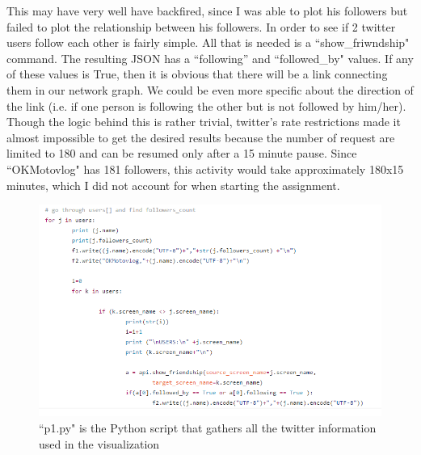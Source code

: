 \documentclass{article}
\begin{document}
This may have very well have backfired, since I was able to plot his followers but failed to plot the relationship between his followers. In order to see if 2 twitter users follow each other is fairly simple. All that is needed is a ``show\_friwndship" command. The resulting JSON has a ``following'' and ``followed\_by" values. If any of these values is True, then it is obvious that there will be a link connecting them in our network graph. We could be even more specific about the direction of the link (i.e. if one person is following the other but is not followed by him/her). Though the logic behind this is rather trivial, twitter's rate restrictions made it almost impossible to get the desired results because the number of request are limited to 180 and can be resumed only after a 15 minute pause. Since ``OKMotovlog" has 181 followers, this activity would take approximately 180x15 minutes, which I did not account for when starting the assignment.

\begin{figure}[H]
 \centering
 	\includegraphics[height=12 cm]{p1code.png}
  \caption{``p1.py" is the Python script that gathers all the twitter information used in the visualization}
\end{figure}
\newpage
\end{document}
